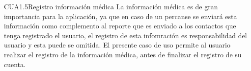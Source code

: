 
\begin{UseCase}{CUA1.5}{Registro información médica}
    {
	La información médica es de gran importancia para la aplicación, ya que en caso de un percanse se enviará esta información como complemento al reporte que es enviado a los contactos que tenga registrado el usuario, el registro de esta infomración es responsabilidad del usuario y esta puede se omitida. El presente caso de uso permite al usuario realizar el registro de la información médica, antes de finalizar el registro de su cuenta.
    }

\end{UseCase}

